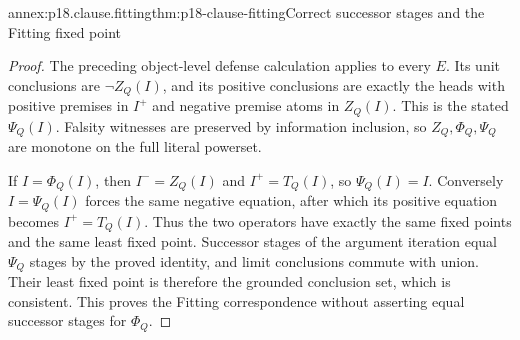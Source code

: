 \begin{annexitem}{annex:p18.clause.fitting}{thm:p18-clause-fitting}{Correct successor stages and the Fitting fixed point}
\begin{proof}
The preceding object-level defense calculation applies
to every \(E\). Its unit conclusions are
\(\neg Z_Q(I)\), and its positive conclusions
are exactly the heads with positive premises
in \(I^+\) and negative premise atoms in
\(Z_Q(I)\). This is the stated \(\Psi_Q(I)\).
Falsity witnesses are preserved by information
inclusion, so \(Z_Q,\Phi_Q,\Psi_Q\) are monotone
on the full literal powerset.

If \(I=\Phi_Q(I)\), then \(I^-=Z_Q(I)\)
and \(I^+=T_Q(I)\), so \(\Psi_Q(I)=I\).
Conversely \(I=\Psi_Q(I)\) forces the
same negative equation, after which its
positive equation becomes \(I^+=T_Q(I)\).
Thus the two operators have exactly
the same fixed points and the same
least fixed point. Successor stages
of the argument iteration equal
\(\Psi_Q\) stages by the proved identity,
and limit conclusions commute with
union. Their least fixed point is
therefore the grounded conclusion set,
which is consistent. This proves the
Fitting correspondence without asserting
equal successor stages for \(\Phi_Q\).
\end{proof}
\end{annexitem}

